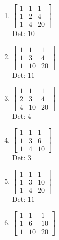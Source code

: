 \documentclass[12pt]{article}
\begin{document}
\begin{enumerate}
\begin{enumerate}
\begin{enumerate}
\item $\displaystyle \left[\begin{matrix}1 & 1 & 1\\1 & 2 & 4\\1 & 4 & 20\end{matrix}\right]$\\

Det: $10$\\


\item $\displaystyle \left[\begin{matrix}1 & 1 & 1\\1 & 3 & 4\\1 & 10 & 20\end{matrix}\right]$\\

Det: $11$\\


\item $\displaystyle \left[\begin{matrix}1 & 1 & 1\\2 & 3 & 4\\4 & 10 & 20\end{matrix}\right]$\\

Det: $4$\\


\item $\displaystyle \left[\begin{matrix}1 & 1 & 1\\1 & 3 & 6\\1 & 4 & 10\end{matrix}\right]$\\

Det: $3$\\


\item $\displaystyle \left[\begin{matrix}1 & 1 & 1\\1 & 3 & 10\\1 & 4 & 20\end{matrix}\right]$\\

Det: $11$\\


\item $\displaystyle \left[\begin{matrix}1 & 1 & 1\\1 & 6 & 10\\1 & 10 & 20\end{matrix}\right]$\\


\end{enumerate}
\end{enumerate}
\end{enumerate}
\end{document}
